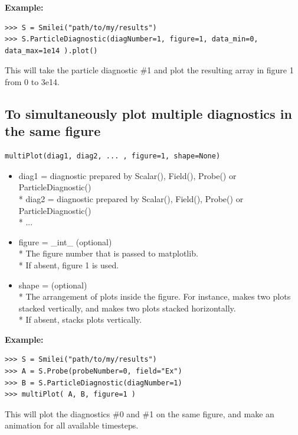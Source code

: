 \documentclass[11pt]{article}
\newcommand{\code}[1]{\colorbox{yellow!15}{\ttfamily #1}}
\begin{document}
\textbf{Example:}
\begin{lstlisting}
>>> S = Smilei("path/to/my/results")
>>> S.ParticleDiagnostic(diagNumber=1, figure=1, data_min=0, data_max=1e14 ).plot()
\end{lstlisting}
This will take the particle diagnostic \#1 and plot the resulting array in figure 1 from 0 to 3e14.
\clearpage


\subsection{To simultaneously plot multiple diagnostics in the same figure}
\begin{lstlisting}
multiPlot(diag1, diag2, ... , figure=1, shape=None)
\end{lstlisting}

\begin{itemize}
\item \code{diag1} = diagnostic prepared by \code{Scalar()}, \code{Field()}, \code{Probe()} or \code{ParticleDiagnostic()}\\*
	\code{diag2} = diagnostic prepared by \code{Scalar()}, \code{Field()}, \code{Probe()} or \code{ParticleDiagnostic()}\\*
	...

\item \code{figure} = \code{\_int\_}       (optional)\\*
	The figure number that is passed to matplotlib.\\*
	If absent, figure 1 is used.
	
\item \code{shape} = \code{[\_int\_ , \_int\_]}       (optional)\\*
	The arrangement of plots inside the figure. For instance, \code{[2, 1]} makes two plots stacked vertically, and \code{[1, 2]} makes two plots stacked horizontally.\\*
	If absent, stacks plots vertically.
\end{itemize}

\textbf{Example:}
\begin{lstlisting}
>>> S = Smilei("path/to/my/results")
>>> A = S.Probe(probeNumber=0, field="Ex")
>>> B = S.ParticleDiagnostic(diagNumber=1)
>>> multiPlot( A, B, figure=1 )
\end{lstlisting}

This will plot the diagnostics \#0 and \#1 on the same figure, and make an animation for all available timesteps.
\end{document}
